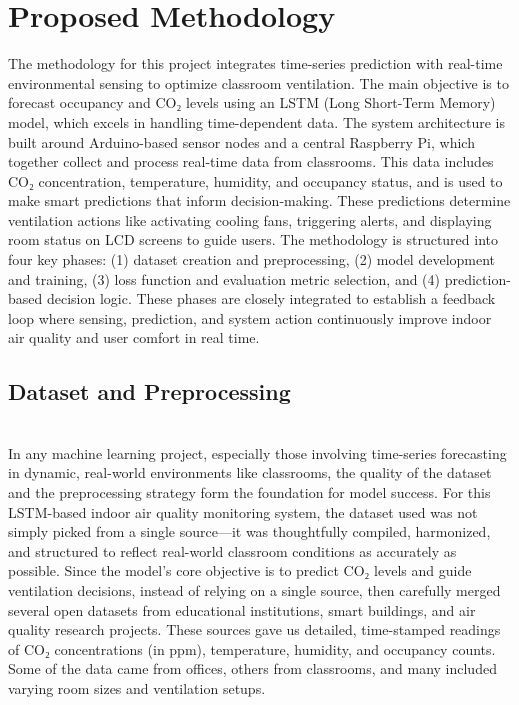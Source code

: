 \chapter{Proposed Methodology}
The methodology for this project integrates time-series prediction with real-time environmental sensing to optimize classroom ventilation. The main objective is to forecast occupancy and CO₂ levels using an LSTM (Long Short-Term Memory) model, which excels in handling time-dependent data. The system architecture is built around Arduino-based sensor nodes and a central Raspberry Pi, which together collect and process real-time data from classrooms. This data includes CO₂ concentration, temperature, humidity, and occupancy status, and is used to make smart predictions that inform decision-making. These predictions determine ventilation actions like activating cooling fans, triggering alerts, and displaying room status on LCD screens to guide users. The methodology is structured into four key phases: (1) dataset creation and preprocessing, (2) model development and training, (3) loss function and evaluation metric selection, and (4) prediction-based decision logic. These phases are closely integrated to establish a feedback loop where sensing, prediction, and system action continuously improve indoor air quality and user comfort in real time.
\section{Dataset and Preprocessing}
\\In any machine learning project, especially those involving time-series forecasting in dynamic, real-world environments like classrooms, the quality of the dataset and the preprocessing strategy form the foundation for model success. For this LSTM-based indoor air quality monitoring system, the dataset used was not simply picked from a single source—it was thoughtfully compiled, harmonized, and structured to reflect real-world classroom conditions as accurately as possible. Since the model’s core objective is to predict CO₂ levels and guide ventilation decisions, instead of relying on a single source, then carefully merged several open datasets from educational institutions, smart buildings, and air quality research projects. These sources gave us detailed, time-stamped readings of CO₂ concentrations (in ppm), temperature, humidity, and occupancy counts. Some of the data came from offices, others from classrooms, and many included varying room sizes and ventilation setups.

